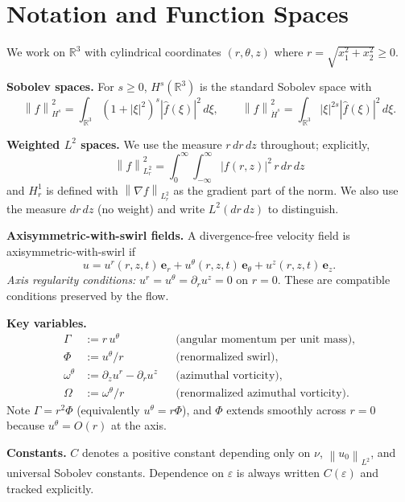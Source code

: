 \documentclass{article}
\theoremstyle{definition}
\theoremstyle{remark}
\newcommand{\R}{\mathbb{R}}
\newcommand{\e}{\varepsilon}
\newcommand{\norm}[1]{\left\|#1\right\|}
\begin{document}
\section{Notation and Function Spaces}\label{sec:notation}

We work on $\R^3$ with cylindrical coordinates $(r,\theta,z)$ where
$r = \sqrt{x_1^2+x_2^2}\ge 0$.

\medskip\noindent
\textbf{Sobolev spaces.}
For $s\ge 0$, $H^s(\R^3)$ is the standard Sobolev space with
\[
  \norm{f}_{H^s}^2 = \int_{\R^3}(1+|\xi|^2)^s|\hat f(\xi)|^2\,d\xi,
  \qquad
  \norm{f}_{\dot H^s}^2 = \int_{\R^3}|\xi|^{2s}|\hat f(\xi)|^2\,d\xi.
\]

\medskip\noindent
\textbf{Weighted $L^2$ spaces.}
We use the measure $r\,dr\,dz$ throughout; explicitly,
\[
  \norm{f}_{L^2_r}^2 = \int_0^\infty\int_{-\infty}^\infty |f(r,z)|^2\,
  r\,dr\,dz
\]
and $H^1_r$ is defined with $\norm{\nabla f}_{L^2_r}$ as the gradient part
of the norm.  We also use the measure $dr\,dz$ (no weight) and write
$L^2(dr\,dz)$ to distinguish.

\medskip\noindent
\textbf{Axisymmetric-with-swirl fields.}
A divergence-free velocity field is axisymmetric-with-swirl if
\[
  u = u^r(r,z,t)\,\mathbf{e}_r + u^\theta(r,z,t)\,\mathbf{e}_\theta
    + u^z(r,z,t)\,\mathbf{e}_z.
\]
\emph{Axis regularity conditions:}  $u^r = u^\theta = \partial_r u^z = 0$
on $r = 0$.  These are compatible conditions preserved by the flow.

\medskip\noindent
\textbf{Key variables.}
\begin{align*}
  \Gamma &:= r\,u^\theta  && \text{(angular momentum per unit mass)},\\
  \Phi   &:= u^\theta/r   && \text{(renormalized swirl)},\\
  \omega^\theta &:= \partial_z u^r - \partial_r u^z
                          && \text{(azimuthal vorticity)},\\
  \Omega &:= \omega^\theta/r
                          && \text{(renormalized azimuthal vorticity)}.
\end{align*}
Note $\Gamma = r^2\Phi$ (equivalently $u^\theta = r\Phi$), and $\Phi$ extends
smoothly across $r=0$ because $u^\theta = O(r)$ at the axis.

\medskip\noindent
\textbf{Constants.}  $C$ denotes a positive constant depending only on
$\nu$, $\norm{u_0}_{L^2}$, and universal Sobolev constants.  Dependence
on $\e$ is always written $C(\e)$ and tracked explicitly.
\end{document}
